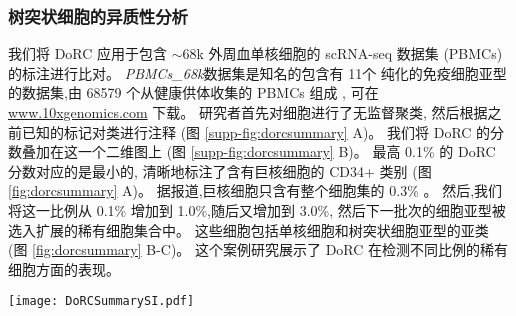 

\subsubsection{树突状细胞的异质性分析}

我们将 DoRC 应用于包含 ${\sim}68$k 外周血单核细胞的 scRNA-seq 数据集 (PBMCs) 的标注进行比对。
 \textit{PBMCs\_68k}数据集是知名的包含有 11个 纯化的免疫细胞亚型的数据集,由 68579 个从健康供体收集的 PBMCs 组成 ,
可在 \url{www.10xgenomics.com} 下载。
研究者首先对细胞进行了无监督聚类,
然后根据之前已知的标记对类进行注释 (图 \ref{supp-fig:dorcsummary} A)。
我们将 DoRC 的分数叠加在这一个二维图上 (图 \ref{supp-fig:dorcsummary} B)。
最高 0.1\% 的 DoRC 分数对应的是最小的, 
清晰地标注了含有巨核细胞的 CD34+ 类别 (图 \ref{fig:dorcsummary} A)。
据报道,巨核细胞只含有整个细胞集的 0.3\% 。
然后,我们将这一比例从 0.1\% 增加到 1.0\%,随后又增加到 3.0\%,
然后下一批次的细胞亚型被选入扩展的稀有细胞集合中。
这些细胞包括单核细胞和树突状细胞亚型的亚类 (图 \ref{fig:dorcsummary} B-C)。
这个案例研究展示了 DoRC 在检测不同比例的稀有细胞方面的表现。

\begin{figure*}[!htbp]
    \centering
    \texttt{[image: DoRCSummarySI.pdf]}
    \caption{
    DoRC 在 PBMCs\_68k 上的性能评估。
    (A) 基于 t-SNE 的二维嵌入数据集可视化图,按 Zheng 等所报道的鉴定的不同类别用不同的颜色标记。
    (B) PBMCs\_68k 上细胞的 DoRC 得分热图。巨核细胞群 (0.3\%),是所有细胞类型中最稀有的细胞,获得了最高的 DoRC 分数。
    (C) 使用 IQR 阈值标准后 DoRC 识别的稀有细胞。
    }
    \label{supp-fig:dorcsummary}
\end{figure*}

